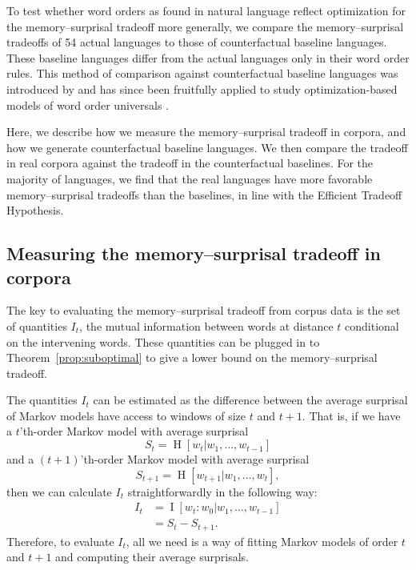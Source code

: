 To test whether word orders as found in natural language reflect optimization for the memory--surprisal tradeoff more generally, we compare the memory--surprisal tradeoffs of 54 actual languages to those of counterfactual baseline languages. These baseline languages differ from the actual languages only in their word order rules. This method of comparison against counterfactual baseline languages was introduced by \citet{gildea-optimizing-2007,gildea-grammars-2010} and has since been fruitfully applied to study optimization-based models of word order universals  \citep{futrell-large-scale-2015,gildea-human-2015,hahn2020universals}.

Here, we describe how we measure the memory--surprisal tradeoff in corpora, and how we generate counterfactual baseline languages. We then compare the tradeoff in real corpora against the tradeoff in the counterfactual baselines. For the majority of languages, we find that the real languages have more favorable memory--surprisal tradeoffs than the baselines, in line with the Efficient Tradeoff Hypothesis.

\subsection{Measuring the memory--surprisal tradeoff in corpora}
\label{sec:measuring}

The key to evaluating the memory--surprisal tradeoff from corpus data is the set of quantities $I_t$, the  mutual information between words at distance $t$ conditional on the intervening words. %
These quantities can be plugged in to Theorem~\ref{prop:suboptimal} to give a lower bound on the memory--surprisal tradeoff.

The quantities $I_t$ can be estimated as the difference between the average surprisal of Markov models have access to windows of size $t$ and $t+1$.
That is, if we have a $t$'th-order Markov model with average surprisal
\begin{equation}
    \label{eq:S_t}
    S_t = \operatorname{H}[w_t | w_1, \dots, w_{t-1}]
\end{equation}
and a $(t+1)$'th-order Markov model with average surprisal
\begin{equation*}
    S_{t+1} = \operatorname{H}[w_{t+1} | w_1, \dots, w_t],
\end{equation*}
then we can calculate $I_t$ straightforwardly in the following way:
\begin{align}
    \nonumber
    I_t &= \operatorname{I}[w_t : w_0 | w_1, \dots, w_{t-1}] \\
    \nonumber
    &= S_t - S_{t+1}.
\end{align}
Therefore, to evaluate $I_t$, all we need is a way of fitting Markov models of order $t$ and $t+1$ and computing their average surprisals.

